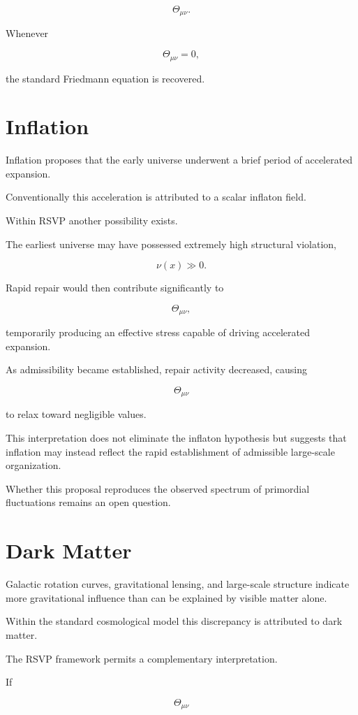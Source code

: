 \documentclass[11pt,oneside]{book}
\numberwithin{equation}{chapter}
\theoremstyle{definition}
\theoremstyle{plain}
\begin{document}
\[
\Theta_{\mu\nu}.
\]

Whenever

\[
\Theta_{\mu\nu}=0,
\]

the standard Friedmann equation is recovered.

\section{Inflation}

Inflation proposes that the early universe underwent a brief period of
accelerated expansion.

Conventionally this acceleration is attributed to a scalar inflaton field.

Within RSVP another possibility exists.

The earliest universe may have possessed extremely high structural
violation,

\[
\nu(x)\gg0.
\]

Rapid repair would then contribute significantly to

\[
\Theta_{\mu\nu},
\]

temporarily producing an effective stress capable of driving accelerated
expansion.

As admissibility became established, repair activity decreased, causing

\[
\Theta_{\mu\nu}
\]

to relax toward negligible values.

This interpretation does not eliminate the inflaton hypothesis but suggests
that inflation may instead reflect the rapid establishment of admissible
large-scale organization.

Whether this proposal reproduces the observed spectrum of primordial
fluctuations remains an open question.

\section{Dark Matter}

Galactic rotation curves, gravitational lensing, and large-scale structure
indicate more gravitational influence than can be explained by visible
matter alone.

Within the standard cosmological model this discrepancy is attributed to
dark matter.

The RSVP framework permits a complementary interpretation.

If

\[
\Theta_{\mu\nu}
\]
\end{document}

